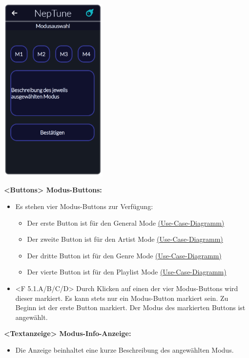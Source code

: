 \documentclass[oneside, ngerman]{sdqtechreport}
\begin{document}
\begin{center}
    \hypertarget{hostModeSelectView}{}
    \includegraphics[width=0.4\textwidth]{LATEX/Pflichtenheft/GraphicDesigns/hostModusSelectPage.png}
\end{center}

\textbf{<Buttons> Modus-Buttons:}
\begin{itemize}
    \item Es stehen vier Modus-Buttons zur Verfügung:
    \begin{itemize}
        \item Der erste Button ist für den General Mode \hyperlink{General Mode}{(Use-Case-Diagramm)}
        \item Der zweite Button ist für den Artist Mode \hyperlink{Artist Mode}{(Use-Case-Diagramm)}
        \item Der dritte Button ist für den Genre Mode \hyperlink{Genre Mode}{(Use-Case-Diagramm)}
        \item Der vierte Button ist für den Playlist Mode \hyperlink{Playlist Mode}{(Use-Case-Diagramm)}
    \end{itemize}
    \item \hypertarget{<F 5.1.M>}{} <F 5.1.A/B/C/D> Durch Klicken auf einen der vier Modus-Buttons wird dieser markiert. Es kann stets nur ein Modus-Button markiert sein. Zu Beginn ist der erste Button markiert. Der Modus des markierten Buttons ist angewählt.
\end{itemize}

\textbf{<Textanzeige> Modus-Info-Anzeige:}
\begin{itemize}
    \item Die Anzeige beinhaltet eine kurze Beschreibung des angewählten Modus.
\end{itemize}
\end{document}

